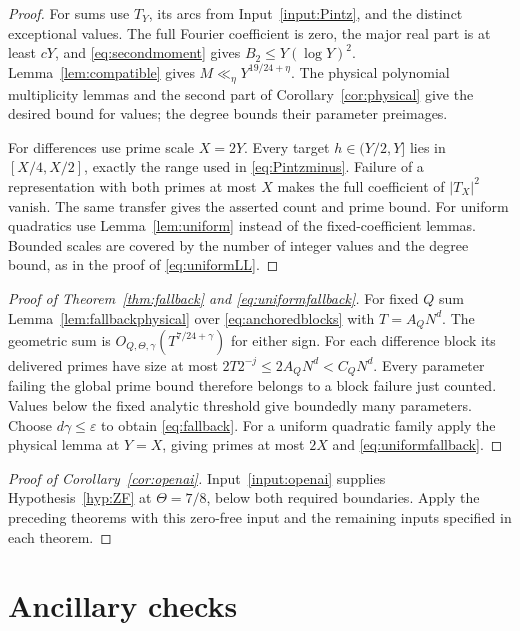 \documentclass[11pt]{article}
\theoremstyle{definition}
\theoremstyle{remark}
\numberwithin{equation}{section}
\newcommand{\eps}{\varepsilon}
\begin{document}
\begin{proof}
For sums use $T_Y$, its arcs from Input~\ref{input:Pintz}, and the
distinct exceptional values. The full Fourier coefficient is zero,
the major real part is at least $cY$, and
\eqref{eq:secondmoment} gives $B_2\le Y(\log Y)^2$.
Lemma~\ref{lem:compatible} gives $M\ll_\eta Y^{19/24+\eta}$.
The physical polynomial multiplicity lemmas and the second part of
Corollary~\ref{cor:physical} give the desired bound for values;
the degree bounds their parameter preimages.

For differences use prime scale $X=2Y$. Every target
$h\in(Y/2,Y]$ lies in $[X/4,X/2]$, exactly the range used in
\eqref{eq:Pintzminus}. Failure of a representation with both primes
at most $X$ makes the full coefficient of $|T_X|^2$ vanish.
The same transfer gives the asserted count and prime bound.
For uniform quadratics use Lemma~\ref{lem:uniform} instead of the
fixed-coefficient lemmas. Bounded scales are covered by the number
of integer values and the degree bound, as in the proof of
\eqref{eq:uniformLL}.
\end{proof}

\begin{proof}[Proof of Theorem~\ref{thm:fallback} and
\eqref{eq:uniformfallback}]
For fixed $Q$ sum Lemma~\ref{lem:fallbackphysical} over
\eqref{eq:anchoredblocks} with $T=A_QN^d$. The geometric sum is
$O_{Q,\Theta,\gamma}(T^{7/24+\gamma})$ for either sign.
For each difference block its delivered primes have size at most
$2T2^{-j}\le2A_QN^d<C_QN^d$. Every parameter failing the global
prime bound therefore belongs to a block failure just counted.
Values below the fixed analytic threshold give boundedly many
parameters. Choose $d\gamma\le\eps$ to obtain \eqref{eq:fallback}.
For a uniform quadratic family apply the physical lemma at $Y=X$,
giving primes at most $2X$ and \eqref{eq:uniformfallback}.
\end{proof}

\begin{proof}[Proof of Corollary~\ref{cor:openai}]
Input~\ref{input:openai} supplies Hypothesis~\ref{hyp:ZF} at
$\Theta=7/8$, below both required boundaries.
Apply the preceding theorems with this zero-free input and the
remaining inputs specified in each theorem.
\end{proof}

\appendix
\section{Ancillary checks}\label{app:checks}
\end{document}
